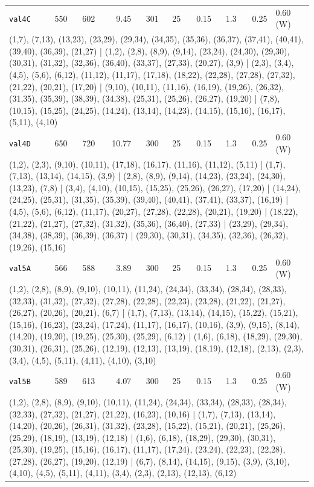 \begin{longtable}{lrrrrrrrrl}
\texttt{val4C} & 550 & 602 & 9.45 & 301 & 25 & 0.15 & 1.3 & 0.25 & 0.60\,(W) \\
\multicolumn{10}{p{0.96\linewidth}}{\tiny\raggedright\arraybackslash (1,7), (7,13), (13,23), (23,29), (29,34), (34,35), (35,36), (36,37), (37,41), (40,41), (39,40), (36,39), (21,27) | (1,2), (2,8), (8,9), (9,14), (23,24), (24,30), (29,30), (30,31), (31,32), (32,36), (36,40), (33,37), (27,33), (20,27), (3,9) | (2,3), (3,4), (4,5), (5,6), (6,12), (11,12), (11,17), (17,18), (18,22), (22,28), (27,28), (27,32), (21,22), (20,21), (17,20) | (9,10), (10,11), (11,16), (16,19), (19,26), (26,32), (31,35), (35,39), (38,39), (34,38), (25,31), (25,26), (26,27), (19,20) | (7,8), (10,15), (15,25), (24,25), (14,24), (13,14), (14,23), (14,15), (15,16), (16,17), (5,11), (4,10)} \\[2pt]
\texttt{val4D} & 650 & 720 & 10.77 & 300 & 25 & 0.15 & 1.3 & 0.25 & 0.60\,(W) \\
\multicolumn{10}{p{0.96\linewidth}}{\tiny\raggedright\arraybackslash (1,2), (2,3), (9,10), (10,11), (17,18), (16,17), (11,16), (11,12), (5,11) | (1,7), (7,13), (13,14), (14,15), (3,9) | (2,8), (8,9), (9,14), (14,23), (23,24), (24,30), (13,23), (7,8) | (3,4), (4,10), (10,15), (15,25), (25,26), (26,27), (17,20) | (14,24), (24,25), (25,31), (31,35), (35,39), (39,40), (40,41), (37,41), (33,37), (16,19) | (4,5), (5,6), (6,12), (11,17), (20,27), (27,28), (22,28), (20,21), (19,20) | (18,22), (21,22), (21,27), (27,32), (31,32), (35,36), (36,40), (27,33) | (23,29), (29,34), (34,38), (38,39), (36,39), (36,37) | (29,30), (30,31), (34,35), (32,36), (26,32), (19,26), (15,16)} \\[2pt]
\texttt{val5A} & 566 & 588 & 3.89 & 300 & 25 & 0.15 & 1.3 & 0.25 & 0.60\,(W) \\
\multicolumn{10}{p{0.96\linewidth}}{\tiny\raggedright\arraybackslash (1,2), (2,8), (8,9), (9,10), (10,11), (11,24), (24,34), (33,34), (28,34), (28,33), (32,33), (31,32), (27,32), (27,28), (22,28), (22,23), (23,28), (21,22), (21,27), (26,27), (20,26), (20,21), (6,7) | (1,7), (7,13), (13,14), (14,15), (15,22), (15,21), (15,16), (16,23), (23,24), (17,24), (11,17), (16,17), (10,16), (3,9), (9,15), (8,14), (14,20), (19,20), (19,25), (25,30), (25,29), (6,12) | (1,6), (6,18), (18,29), (29,30), (30,31), (26,31), (25,26), (12,19), (12,13), (13,19), (18,19), (12,18), (2,13), (2,3), (3,4), (4,5), (5,11), (4,11), (4,10), (3,10)} \\[2pt]
\texttt{val5B} & 589 & 613 & 4.07 & 300 & 25 & 0.15 & 1.3 & 0.25 & 0.60\,(W) \\
\multicolumn{10}{p{0.96\linewidth}}{\tiny\raggedright\arraybackslash (1,2), (2,8), (8,9), (9,10), (10,11), (11,24), (24,34), (33,34), (28,33), (28,34), (32,33), (27,32), (21,27), (21,22), (16,23), (10,16) | (1,7), (7,13), (13,14), (14,20), (20,26), (26,31), (31,32), (23,28), (15,22), (15,21), (20,21), (25,26), (25,29), (18,19), (13,19), (12,18) | (1,6), (6,18), (18,29), (29,30), (30,31), (25,30), (19,25), (15,16), (16,17), (11,17), (17,24), (23,24), (22,23), (22,28), (27,28), (26,27), (19,20), (12,19) | (6,7), (8,14), (14,15), (9,15), (3,9), (3,10), (4,10), (4,5), (5,11), (4,11), (3,4), (2,3), (2,13), (12,13), (6,12)} \\[2pt]

\end{longtable}
